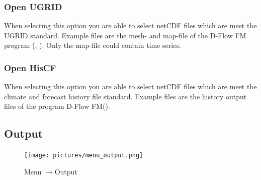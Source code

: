 \documentclass{deltares_memo}
\newcommand{\menuarrow}{$\rightarrow$}
\newcommand{\dflowfm}{D-Flow FM\xspace}
\newcommand{\netcdf}{netCDF\xspace}
\begin{document}
\subsubsection{Open UGRID}
When selecting this option you are able to select \netcdf files which are meet the UGRID standard. 
Example files are the mesh- and map-file of the \dflowfm program (, ).
Only the map-file could contain time series.
\subsubsection{Open HisCF}
When selecting this option you are able to select \netcdf files which are meet the climate and forecast history file standard.
Example files are the history output files of the program \dflowfm ().
\subsection{Output}
\phantom{m}\vspace{-\baselineskip}
\begin{figure}[H]
    \centering    
    \texttt{[image: pictures/menu\_output.png]}
    \caption{Menu \menuarrow Output}
\end{figure}

\end{document}
